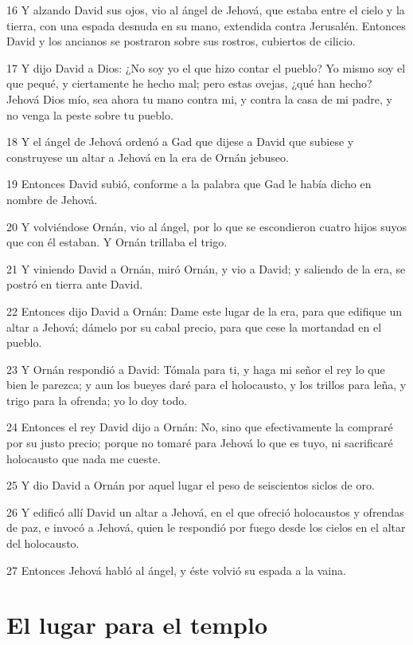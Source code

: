 \par 16 Y alzando David sus ojos, vio al ángel de Jehová, que estaba entre el cielo y la tierra, con una espada desnuda en su mano, extendida contra Jerusalén. Entonces David y los ancianos se postraron sobre sus rostros, cubiertos de cilicio.
\par 17 Y dijo David a Dios: ¿No soy yo el que hizo contar el pueblo? Yo mismo soy el que pequé, y ciertamente he hecho mal; pero estas ovejas, ¿qué han hecho? Jehová Dios mío, sea ahora tu mano contra mi, y contra la casa de mi padre, y no venga la peste sobre tu pueblo.
\par 18 Y el ángel de Jehová ordenó a Gad que dijese a David que subiese y construyese un altar a Jehová en la era de Ornán jebuseo.
\par 19 Entonces David subió, conforme a la palabra que Gad le había dicho en nombre de Jehová.
\par 20 Y volviéndose Ornán, vio al ángel, por lo que se escondieron cuatro hijos suyos que con él estaban. Y Ornán trillaba el trigo.
\par 21 Y viniendo David a Ornán, miró Ornán, y vio a David; y saliendo de la era, se postró en tierra ante David.
\par 22 Entonces dijo David a Ornán: Dame este lugar de la era, para que edifique un altar a Jehová; dámelo por su cabal precio, para que cese la mortandad en el pueblo.
\par 23 Y Ornán respondió a David: Tómala para ti, y haga mi señor el rey lo que bien le parezca; y aun los bueyes daré para el holocausto, y los trillos para leña, y trigo para la ofrenda; yo lo doy todo.
\par 24 Entonces el rey David dijo a Ornán: No, sino que efectivamente la compraré por su justo precio; porque no tomaré para Jehová lo que es tuyo, ni sacrificaré holocausto que nada me cueste.
\par 25 Y dio David a Ornán por aquel lugar el peso de seiscientos siclos de oro.
\par 26 Y edificó allí David un altar a Jehová, en el que ofreció holocaustos y ofrendas de paz, e invocó a Jehová, quien le respondió por fuego desde los cielos en el altar del holocausto.
\par 27 Entonces Jehová habló al ángel, y éste volvió su espada a la vaina.

\section*{El lugar para el templo}

